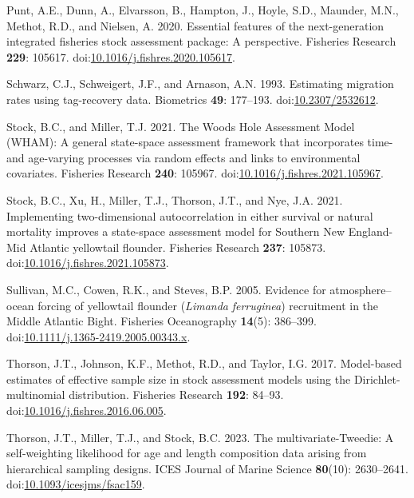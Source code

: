 \documentclass[
]{article}
\newlength{\cslhangindent}
\newlength{\cslentryspacingunit} %
\newenvironment{CSLReferences}[2] %
 {%
  \setlength{\parindent}{0pt}
  \ifodd #1
  \let\oldpar\par
  \def\par{\hangindent=\cslhangindent\oldpar}
  \fi
  \setlength{\parskip}{#2\cslentryspacingunit}
 }%
 {}
\begin{document}
\begin{CSLReferences}{1}{0}
\leavevmode{}%
Punt, A.E., Dunn, A., Elvarsson, B., Hampton, J., Hoyle, S.D., Maunder, M.N., Methot, R.D., and Nielsen, A. 2020. Essential features of the next-generation integrated fisheries stock assessment package: A perspective. Fisheries Research \textbf{229}: 105617. doi:\href{https://doi.org/10.1016/j.fishres.2020.105617}{10.1016/j.fishres.2020.105617}.

\leavevmode{}%
Schwarz, C.J., Schweigert, J.F., and Arnason, A.N. 1993. Estimating migration rates using tag-recovery data. Biometrics \textbf{49}: 177--193. doi:\href{https://doi.org/10.2307/2532612}{10.2307/2532612}.

\leavevmode{}%
Stock, B.C., and Miller, T.J. 2021. The {Woods Hole Assessment Model} ({WHAM}): A general state-space assessment framework that incorporates time- and age-varying processes via random effects and links to environmental covariates. Fisheries Research \textbf{240}: 105967. doi:\href{https://doi.org/10.1016/j.fishres.2021.105967}{10.1016/j.fishres.2021.105967}.

\leavevmode{}%
Stock, B.C., Xu, H., Miller, T.J., Thorson, J.T., and Nye, J.A. 2021. Implementing two-dimensional autocorrelation in either survival or natural mortality improves a state-space assessment model for {Southern New England}-{Mid Atlantic} yellowtail flounder. Fisheries Research \textbf{237}: 105873. doi:\href{https://doi.org/10.1016/j.fishres.2021.105873}{10.1016/j.fishres.2021.105873}.

\leavevmode{}%
Sullivan, M.C., Cowen, R.K., and Steves, B.P. 2005. Evidence for atmosphere{--}ocean forcing of yellowtail flounder (\emph{{L}imanda} \emph{ferruginea}) recruitment in the {M}iddle {A}tlantic {B}ight. Fisheries Oceanography \textbf{14}(5): 386--399. doi:\href{https://doi.org/10.1111/j.1365-2419.2005.00343.x}{10.1111/j.1365-2419.2005.00343.x}.

\leavevmode{}%
Thorson, J.T., Johnson, K.F., Methot, R.D., and Taylor, I.G. 2017. Model-based estimates of effective sample size in stock assessment models using the {D}irichlet-multinomial distribution. Fisheries Research \textbf{192}: 84--93. doi:\href{https://doi.org/10.1016/j.fishres.2016.06.005}{10.1016/j.fishres.2016.06.005}.

\leavevmode{}%
Thorson, J.T., Miller, T.J., and Stock, B.C. 2023. The multivariate-{T}weedie: A self-weighting likelihood for age and length composition data arising from hierarchical sampling designs. ICES Journal of Marine Science \textbf{80}(10): 2630--2641. doi:\href{https://doi.org/10.1093/icesjms/fsac159}{10.1093/icesjms/fsac159}.


\end{CSLReferences}
\end{document}
